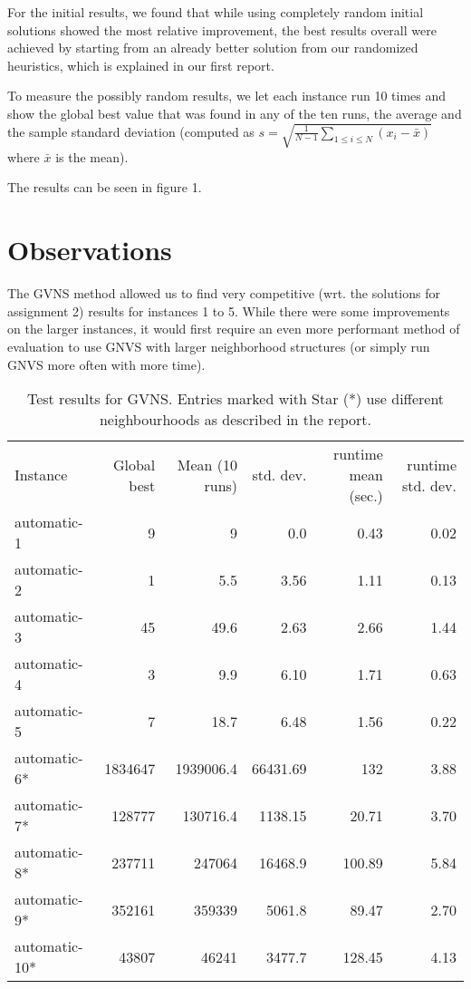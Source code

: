\documentclass [11pt]{article}
\begin{document}
For the initial results, we found that while using completely random initial solutions showed the most relative improvement, the best results overall were achieved by starting from an already better solution from our randomized heuristics, which is explained in our first report. 

To measure the possibly random results, we let each instance run 10 times and show the global best value that was found in any of the ten runs, the average and the sample standard deviation (computed as $ s = \sqrt{\frac{1}{N - 1} \sum_{1\leq i \leq N}{(x_i - \bar{x})}}$ where $\bar{x}$ is the mean). 

The results can be seen in figure 1.


\section{Observations}
The GVNS method allowed us to find very competitive (wrt. the solutions for assignment 2) results for instances 1 to 5. While there were some improvements on the larger instances, it would first require an even more performant method of evaluation to use GNVS with larger neighborhood structures (or simply run GNVS more often with more time). 

\newpage

\begin{sidewaystable}
  \centering
 \label{fig:results}
  \everyrow{\hline}
  \begin{tabu} {| l |r | r |r |r|r}
  Instance        & Global best   & Mean (10 runs)   & std. dev. & runtime mean (sec.) & runtime std. dev.    \\ 
  automatic-1     & 9             & 9                   & 0.0           &  0.43 & 0.02       \\ 
  automatic-2     & 1             & 5.5                 & 3.56          &  1.11 & 0.13       \\ 
  automatic-3     & 45            & 49.6                & 2.63          &  2.66 & 1.44        \\ 
  automatic-4     & 3             & 9.9                 & 6.10          &  1.71 & 0.63        \\ 
  automatic-5     & 7             & 18.7                & 6.48          &  1.56 & 0.22        \\ 
  automatic-6*     & 1834647       & 1939006.4           & 66431.69      &  132 & 3.88        \\ 
  automatic-7*     & 128777        & 130716.4            & 1138.15       &  20.71 & 3.70        \\ 
  automatic-8*     & 237711        & 247064              & 16468.9       &  100.89 & 5.84        \\ 
  automatic-9*     & 352161        & 359339              & 5061.8        &  89.47 & 2.70        \\ 
  automatic-10*    & 43807         & 46241               & 3477.7        &  128.45 & 4.13        \\ 
\end{tabu}
\caption{Test results for GVNS. Entries marked with Star (*) use different neighbourhoods as described in the report.} 
\end{sidewaystable}
\end{document}
